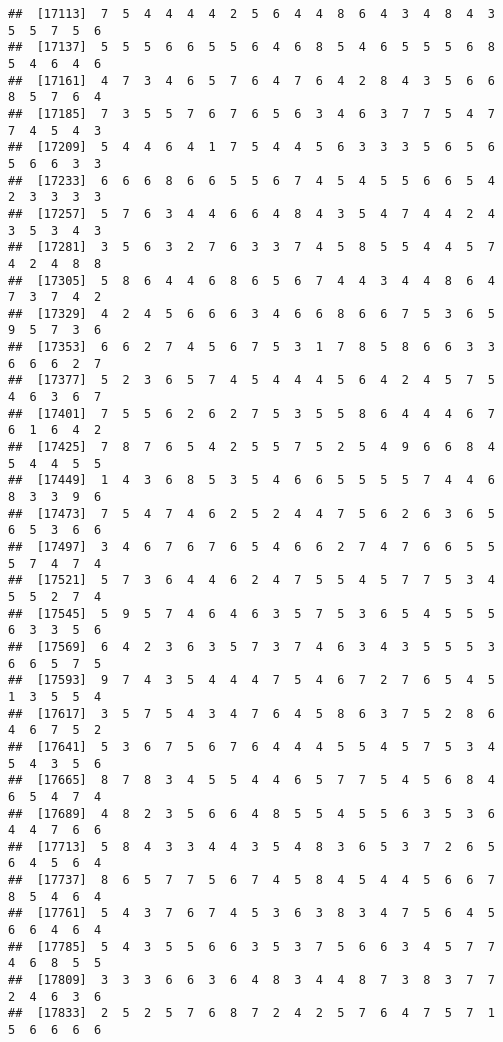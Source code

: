 \documentclass[
]{book}
\begin{document}
\begin{verbatim}
##  [17113]  7  5  4  4  4  4  2  5  6  4  4  8  6  4  3  4  8  4  3  5  5  7  5  6
##  [17137]  5  5  5  6  6  5  5  6  4  6  8  5  4  6  5  5  5  6  8  5  4  6  4  6
##  [17161]  4  7  3  4  6  5  7  6  4  7  6  4  2  8  4  3  5  6  6  8  5  7  6  4
##  [17185]  7  3  5  5  7  6  7  6  5  6  3  4  6  3  7  7  5  4  7  7  4  5  4  3
##  [17209]  5  4  4  6  4  1  7  5  4  4  5  6  3  3  3  5  6  5  6  5  6  6  3  3
##  [17233]  6  6  6  8  6  6  5  5  6  7  4  5  4  5  5  6  6  5  4  2  3  3  3  3
##  [17257]  5  7  6  3  4  4  6  6  4  8  4  3  5  4  7  4  4  2  4  3  5  3  4  3
##  [17281]  3  5  6  3  2  7  6  3  3  7  4  5  8  5  5  4  4  5  7  4  2  4  8  8
##  [17305]  5  8  6  4  4  6  8  6  5  6  7  4  4  3  4  4  8  6  4  7  3  7  4  2
##  [17329]  4  2  4  5  6  6  6  3  4  6  6  8  6  6  7  5  3  6  5  9  5  7  3  6
##  [17353]  6  6  2  7  4  5  6  7  5  3  1  7  8  5  8  6  6  3  3  6  6  6  2  7
##  [17377]  5  2  3  6  5  7  4  5  4  4  4  5  6  4  2  4  5  7  5  4  6  3  6  7
##  [17401]  7  5  5  6  2  6  2  7  5  3  5  5  8  6  4  4  4  6  7  6  1  6  4  2
##  [17425]  7  8  7  6  5  4  2  5  5  7  5  2  5  4  9  6  6  8  4  5  4  4  5  5
##  [17449]  1  4  3  6  8  5  3  5  4  6  6  5  5  5  5  7  4  4  6  8  3  3  9  6
##  [17473]  7  5  4  7  4  6  2  5  2  4  4  7  5  6  2  6  3  6  5  6  5  3  6  6
##  [17497]  3  4  6  7  6  7  6  5  4  6  6  2  7  4  7  6  6  5  5  5  7  4  7  4
##  [17521]  5  7  3  6  4  4  6  2  4  7  5  5  4  5  7  7  5  3  4  5  5  2  7  4
##  [17545]  5  9  5  7  4  6  4  6  3  5  7  5  3  6  5  4  5  5  5  6  3  3  5  6
##  [17569]  6  4  2  3  6  3  5  7  3  7  4  6  3  4  3  5  5  5  3  6  6  5  7  5
##  [17593]  9  7  4  3  5  4  4  4  7  5  4  6  7  2  7  6  5  4  5  1  3  5  5  4
##  [17617]  3  5  7  5  4  3  4  7  6  4  5  8  6  3  7  5  2  8  6  4  6  7  5  2
##  [17641]  5  3  6  7  5  6  7  6  4  4  4  5  5  4  5  7  5  3  4  5  4  3  5  6
##  [17665]  8  7  8  3  4  5  5  4  4  6  5  7  7  5  4  5  6  8  4  6  5  4  7  4
##  [17689]  4  8  2  3  5  6  6  4  8  5  5  4  5  5  6  3  5  3  6  4  4  7  6  6
##  [17713]  5  8  4  3  3  4  4  3  5  4  8  3  6  5  3  7  2  6  5  6  4  5  6  4
##  [17737]  8  6  5  7  7  5  6  7  4  5  8  4  5  4  4  5  6  6  7  8  5  4  6  4
##  [17761]  5  4  3  7  6  7  4  5  3  6  3  8  3  4  7  5  6  4  5  6  6  4  6  4
##  [17785]  5  4  3  5  5  6  6  3  5  3  7  5  6  6  3  4  5  7  7  4  6  8  5  5
##  [17809]  3  3  3  6  6  3  6  4  8  3  4  4  8  7  3  8  3  7  7  2  4  6  3  6
##  [17833]  2  5  2  5  7  6  8  7  2  4  2  5  7  6  4  7  5  7  1  5  6  6  6  6

\end{verbatim}
\end{document}
